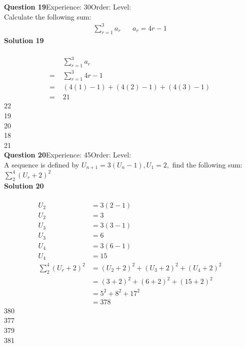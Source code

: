 \documentclass{article}
\begin{document}
\noindent\textbf{Question 19}\hspace{20pt}Experience: 30\hspace{20pt}Order: \hspace{20pt}Level: \\[2pt]
Calculate the following sum:
\begin{align*}
\sum_{r=1}^{3} a_r \hspace{20pt}a_r=4r-1
\end{align*}
\noindent\textbf{Solution 19}\\[2pt]
\\[-10pt]\begin{align*}
&\sum_{r=1}^{3} a_r\\[2pt]
=\,\,&\sum_{r=1}^{3} 4r-1\\[2pt]
=\,\,&(4(1)-1)+(4(2)-1)+(4(3)-1) \\[2pt]
=\,\,&21
\end{align*}
22\\
19\\
20\\
18\\
21\\
\noindent\textbf{Question 20}\hspace{20pt}Experience: 45\hspace{20pt}Order: \hspace{20pt}Level: \\[2pt]
A sequence is defined by $U_{n+1}=3(U_n -1), U_1=2,$ find the following sum: $\displaystyle\sum_{2}^{4} (U_r+2)^2$\\[4pt]
\noindent\textbf{Solution 20}\\[2pt]
\\[-10pt]\begin{align*}
U_2&=3(2-1)\\[2pt]
U_2&=3\\[12pt]
U_3&=3(3-1)\\[2pt]
U_3&=6\\[12pt]
U_4&=3(6-1)\\[2pt]
U_4&=15\\[12pt]
\displaystyle\sum_{2}^{4} (U_r+2)^2&=(U_2+2)^2+(U_3+2)^2+(U_4+2)^2\\[2pt]
&=(3+2)^2+(6+2)^2+(15+2)^2\\[2pt]
&=5^2+8^2+17^2\\[2pt]
&=378
\end{align*}
380\\
377\\
379\\
381\\
\end{document}
